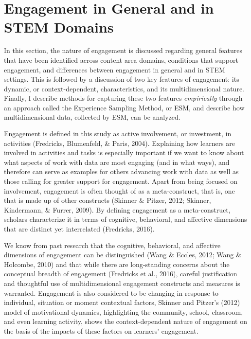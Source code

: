 \documentclass[]{book}
\theoremstyle{definition}
\theoremstyle{definition}
\theoremstyle{definition}
\theoremstyle{remark}
\begin{document}
\section{Engagement in General and in STEM
Domains}\label{engagement-in-general-and-in-stem-domains}

In this section, the nature of engagement is discussed regarding general
features that have been identified across content area domains,
conditions that support engagement, and differences between engagement
in general and in STEM settings. This is followed by a discussion of two
key features of engagement: its dynamic, or context-dependent,
characteristics, and its multidimensional nature. Finally, I describe
methods for capturing these two features \emph{empirically} through an
approach called the Experience Sampling Method, or ESM, and describe how
multidimensional data, collected by ESM, can be analyzed.

Engagement is defined in this study as active involvement, or
investment, in activities (Fredricks, Blumenfeld, \& Paris, 2004).
Explaining how learners are involved in activities and tasks is
especially important if we want to know about what aspects of work with
data are most engaging (and in what ways), and therefore can serve as
examples for others advancing work with data as well as those calling
for greater support for engagement. Apart from being focused on
involvement, engagement is often thought of as a meta-construct, that
is, one that is made up of other constructs (Skinner \& Pitzer, 2012;
Skinner, Kindermann, \& Furrer, 2009). By defining engagement as a
meta-construct, scholars characterize it in terms of cognitive,
behavioral, and affective dimensions that are distinct yet interrelated
(Fredricks, 2016).

We know from past research that the cognitive, behavioral, and affective
dimensions of engagement can be distinguished (Wang \& Eccles, 2012;
Wang \& Holcombe, 2010) and that while there are long-standing concerns
about the conceptual breadth of engagement (Fredricks et al., 2016),
careful justification and thoughtful use of multidimensional engagement
constructs and measures is warranted. Engagement is also considered to
be changing in response to individual, situation or moment contextual
factors, Skinner and Pitzer's (2012) model of motivational dynamics,
highlighting the community, school, classroom, and even learning
activity, shows the context-dependent nature of engagement on the basis
of the impacts of these factors on learners' engagement.
\end{document}
